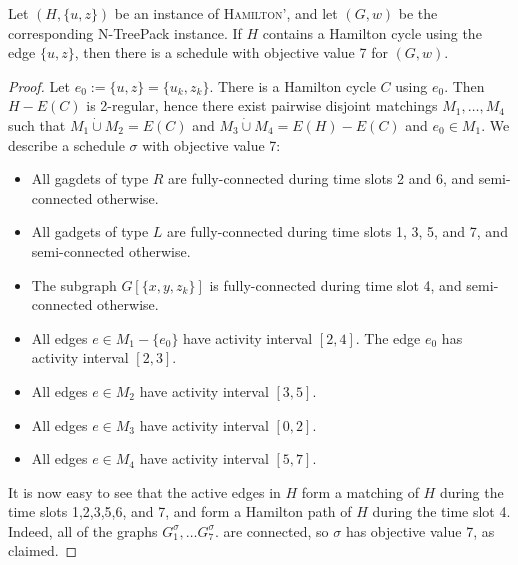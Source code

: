 \documentclass[runningheads]{llncs}
\newcommand{\set}[1]{\{ #1 \}}
\newcommand{\dotunion}{\mathbin{\dot{\cup}}}
\newcommand{\xxxNTP}{{\sc N-TreePack}}
\begin{document}
\begin{lemma}
\label{lemma:inapprox-if}
Let $(H, \set{u, z})$ be an instance of \textsc{Hamilton'}, and let $(G, w)$ be the corresponding {\xxxNTP} instance. If $H$ contains a Hamilton cycle using the edge $\set{u, z}$, then there is a schedule with objective value 7 for $(G, w)$.
\end{lemma}
\begin{proof}
Let $e_0 := \set{u, z} = \set{u_k, z_k}$. There is a Hamilton cycle $C$ using $e_0$. Then $H - E(C)$ is 2-regular, hence there exist pairwise disjoint matchings $M_1, \ldots, M_4$ such that $M_1 \dotunion M_2 = E(C)$ and $M_3 \dotunion M_4 = E(H)-E(C)$ and $e_0 \in M_1$. We describe a schedule $\sigma$ with objective value 7:
\begin{itemize}
\item All gagdets of type $R$ are fully-connected during time slots 2 and 6, and semi-connected otherwise.
\item All gadgets of type $L$ are fully-connected during time slots 1, 3, 5, and 7, and semi-connected otherwise.
\item The subgraph $G[\set{x, y, z_k}]$ is fully-connected during time slot 4, and semi-connected otherwise.
\item All edges $e \in M_1 - \set{e_0}$ have activity interval $[2, 4]$. The edge $e_0$ has activity interval $[2, 3]$.
\item All edges $e \in M_2$ have activity interval $[3, 5]$.
\item All edges $e \in M_3$ have activity interval $[0, 2]$.
\item All edges $e \in M_4$ have activity interval $[5, 7]$.
\end{itemize}
It is now easy to see that the active edges in $H$ form a matching of $H$ during the time slots 1,2,3,5,6, and 7, and form a Hamilton path of $H$ during the time slot 4. Indeed, all of the graphs $G^\sigma_1, \dots G^\sigma_7$. are connected, so $\sigma$ has objective value 7, as claimed.
\end{proof}
\end{document}
